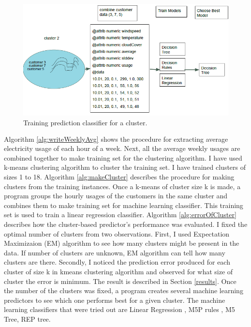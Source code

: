 \begin{figure}[h!]
  \includegraphics[width=\linewidth]{cluster-toy-2.png}
  \caption{Training prediction classifier for a cluster.}
  \label{fig:toy-clust-2}
\end{figure}

Algorithm \ref{alg:writeWeeklyAvg} shows the procedure for extracting average electricity usage of each hour of a week. Next, all the average weekly usages are combined together to make training set for the clustering algorithm. I have used k-means \cite{witten2005data} clustering algorithm to cluster the  training set. I have trained clusters of sizes 1 to 18. Algorithm \ref{alg:makeCluster} describes the procedure for making clusters from the training instances. Once a k-means of cluster size k is made, a program groups the hourly usages of the customers in the same cluster and combines them to make training set for  machine learning classifier. This training set is used to train a  linear regression classifier. Algorithm \ref{alg:errorOfCluster} describes how the cluster-based predictor's performance was evaluated. I fixed the optimal number of clusters from two observations. First, I used Expectation Maximizaion (EM) algorithm to see how many clusters might be present in the data. If number of clusters are unknown, EM algorithm can tell how many clusters are there. Secondly, I noticed the prediction error produced for each cluster of size k in kmeans clustering algorithm and observed for what size of cluster the error is minimum. The result is described in Section \ref{results}. Once the number of the clusters was fixed, a program creates several machine learning predictors to see which one performs best for a given cluster. The machine learning classifiers that were tried out are Linear Regression \cite{witten2005data}, M5P rules \cite{witten2005data}, M5 Tree\cite{witten2005data}, REP tree\cite{witten2005data}. 

